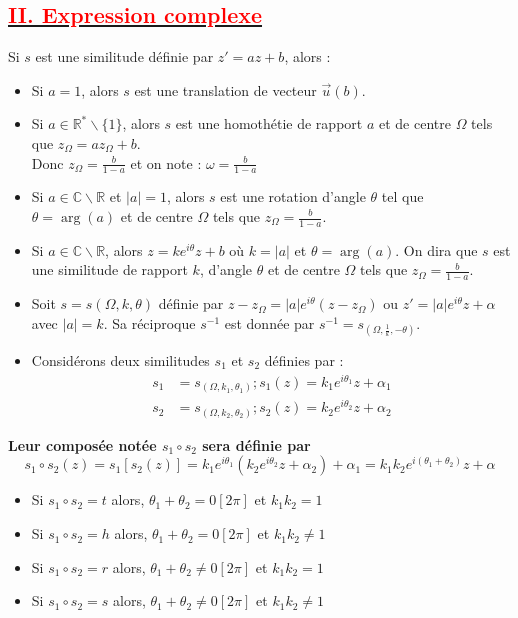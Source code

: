 \documentclass[12pt]{article}
\begin{document}
\subsection*{\underline{\textbf{\textcolor{red}{II. Expression complexe}}}}
Si $s$ est une similitude définie par $z' = az + b$, alors :
\begin{itemize}
    \item Si $a = 1$, alors $s$ est une translation de vecteur $\overrightarrow{u}(b)$.
    \item Si $a \in \mathbb{R}^* \backslash \{1\}$, alors $s$ est une homothétie de rapport $a$ et de centre $\Omega$ tels que $z_\Omega = az_\Omega + b$.\\
    Donc $z_\Omega = \frac{b}{1-a}$ et on note : $\omega = \frac{b}{1-a}$
    \item Si $a \in \mathbb{C} \backslash \mathbb{R}$ et $|a| = 1$, alors $s$ est une rotation d'angle $\theta$ tel que $\theta = \arg(a)$ et de centre $\Omega$ tels que $z_\Omega = \frac{b}{1-a}$.
    \item Si $a \in \mathbb{C} \backslash \mathbb{R}$, alors $z = ke^{i\theta}z + b$ où $k = |a|$ et $\theta = \arg(a)$. On dira que $s$ est une similitude de rapport $k$, d'angle $\theta$ et de centre $\Omega$ tels que $z_\Omega = \frac{b}{1-a}$.\\
    \item Soit $s = s(\Omega,k,\theta)$ définie par $z - z_\Omega = |a|e^{i\theta} (z - z_\Omega)$ ou $z' = |a|e^{i\theta} z + \alpha$ avec $|a|=k$.
  Sa réciproque $s^{-1}$ est donnée par $s^{-1} = s_{(\Omega, \frac{1}{k} ,- \theta)}$.\\ 
    \item Considérons deux similitudes $s_1$ et $s_2$ définies par :
    \begin{align*}
        s_1 &= s_{(\Omega,k_1 ,\theta_1)} ; s_{1}(z)= k_1 e^{i\theta_1} z + \alpha_1 \\
        s_2 &= s_{(\Omega,k_2 ,\theta_2)} ; s_{2}(z)= k_2 e^{i\theta_2} z + \alpha_2
    \end{align*}
\end{itemize}
\textbf{Leur composée notée $s_1 \circ s_2$ sera définie par}
\[ s_1 \circ s_2(z)=s_1[s_2(z)]= k_1 e^{i\theta_1} (k_2 e^{i\theta_2} z + \alpha_2) + \alpha_1 = k_1 k_2 e^{i(\theta_1 + \theta_2)}z + \alpha \]

\begin{itemize}
    \item Si $s_1 \circ s_2 = t$ alors, $\theta_1 + \theta_2 = 0[2\pi]$ et $k_1 k_2 = 1$
    \item Si $s_1 \circ s_2 = h$ alors, $\theta_1 + \theta_2 = 0[2\pi]$ et $k_1 k_2 \neq 1$ 
    \item Si $s_1 \circ s_2 = r$ alors, $\theta_1 + \theta_2 \neq 0[2\pi]$ et $k_1 k_2 = 1$
    \item Si $s_1 \circ s_2 = s$ alors, $\theta_1 + \theta_2 \neq 0[2\pi]$ et $k_1 k_2 \neq 1$
\end{itemize}
\end{document}
